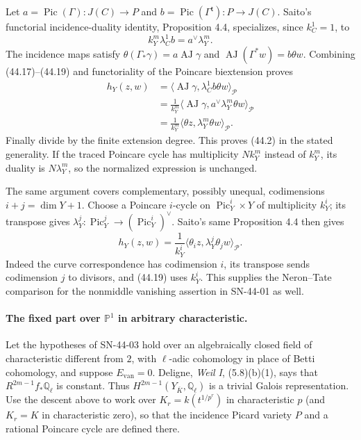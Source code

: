 \documentclass[11pt,a4paper]{article}
\theoremstyle{definition}
\theoremstyle{remark}
\begin{document}
Let $a=\operatorname{Pic}(\Gamma):J(C)\to P$ and
$b=\operatorname{Pic}(\Gamma^{\mathsf t}):P\to J(C)$.
Saito's functorial incidence-duality identity, Proposition 4.4,
specializes, since $k_C^1=1$, to
\[
 k_Y^m\lambda_C^1 b=a^\vee\lambda_Y^m.                    \tag{44.19}
\]
The incidence maps satisfy
$\theta(\Gamma_*\gamma)=a\operatorname{AJ}\gamma$ and
$\operatorname{AJ}(\Gamma^*w)=b\theta w$.
Combining (44.17)--(44.19) and functoriality of the Poincare
biextension proves
\[
\begin{split}
h_Y(z,w)
 &=\langle\operatorname{AJ}\gamma,
                 \lambda_C^1 b\theta w\rangle_{\mathcal P}\\
 &=\frac1{k_Y^m}\langle\operatorname{AJ}\gamma,
                 a^\vee\lambda_Y^m\theta w\rangle_{\mathcal P}\\
 &=\frac1{k_Y^m}\langle\theta z,
                 \lambda_Y^m\theta w\rangle_{\mathcal P}.
\end{split}
\]
Finally divide by the finite extension degree.  This proves
(44.2) in the stated generality.  If the traced Poincare cycle
has multiplicity $N k_Y^m$ instead of $k_Y^m$, its duality is
$N\lambda_Y^m$, so the normalized expression is unchanged.

The same argument covers complementary, possibly unequal,
codimensions $i+j=\dim Y+1$.  Choose a Poincare $i$-cycle on
$\operatorname{Pic}^i_Y\times Y$ of multiplicity $k_Y^i$; its
transpose gives
$\lambda_Y^j:\operatorname{Pic}^j_Y\to
(\operatorname{Pic}^i_Y)^\vee$.  Saito's same Proposition 4.4
then gives
\[
 h_Y(z,w)=\frac1{k_Y^i}
       \langle\theta_i z,\lambda_Y^j\theta_j w\rangle_{\mathcal P}.
\]
Indeed the curve correspondence has codimension $i$, its transpose
sends codimension $j$ to divisors, and (44.19) uses $k_Y^i$.
This supplies the Neron--Tate comparison for the nonmiddle
vanishing assertion in SN-44-01 as well.

\paragraph{The fixed part over $\mathbb P^1$ in arbitrary characteristic.}
Let the hypotheses of SN-44-03 hold over an algebraically closed
field of characteristic different from $2$, with $\ell$-adic
cohomology in place of Betti cohomology, and suppose
$E_{\mathrm{van}}=0$.  Deligne, \emph{Weil I}, (5.8)(b)(1),
says that $R^{2m-1}f_*\mathbb Q_\ell$ is constant.  Thus
$H^{2m-1}(Y_{\overline K},\mathbb Q_\ell)$ is a trivial
Galois representation.  Use the descent above to work over
$K_r=k(t^{1/p^r})$ in characteristic $p$ (and $K_r=K$ in
characteristic zero), so that the incidence Picard variety $P$
and a rational Poincare cycle are defined there.
\end{document}
